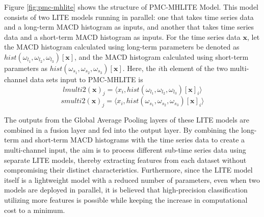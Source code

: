 \documentclass[conference]{IEEEtran}
\begin{document}
Figure \ref{fig:pmc-mhlite} shows the structure of PMC-MHLITE Model. This model consists of two LITE models running in parallel: one that takes time series data and a long-term MACD histogram as inputs, and another that takes time series data and a short-term MACD histogram as inputs. For the time series data $\mathbf{x}$, let the MACD histogram calculated using long-term parameters be denoted as $hist(\omega_{l_1}, \omega_{l_2}, \omega_{l_3})[\mathbf{x}]$, and the MACD histogram calculated using short-term parameters as $hist(\omega_{s_1},\omega_{s_2},\omega_{s_3})[\mathbf{x}]$. Here, the $i$th element of the two multi-channel data sets input to PMC-MHLITE is
\begin{equation}
lmulti2(\mathbf{x})_j = \langle x_i, hist(\omega_{l_1},\omega_{l_2},\omega_{l_3})[\mathbf{x}]_i \rangle
\end{equation}
\begin{equation}
smulti2(\mathbf{x})_j = \langle x_i, hist(\omega_{s_1},\omega_{s_2},\omega_{s_3})[\mathbf{x}]_i \rangle
\end{equation}

The outputs from the Global Average Pooling layers of these LITE models are combined in a fusion layer and fed into the output layer. By combining the long-term and short-term MACD histograms with the time series data to create a multi-channel input, the aim is to process different sub-time series data using separate LITE models, thereby extracting features from each dataset without compromising their distinct characteristics. Furthermore, since the LITE model itself is a lightweight model with a reduced number of parameters, even when two models are deployed in parallel, it is believed that high-precision classification utilizing more features is possible while keeping the increase in computational cost to a minimum.

\end{document}
